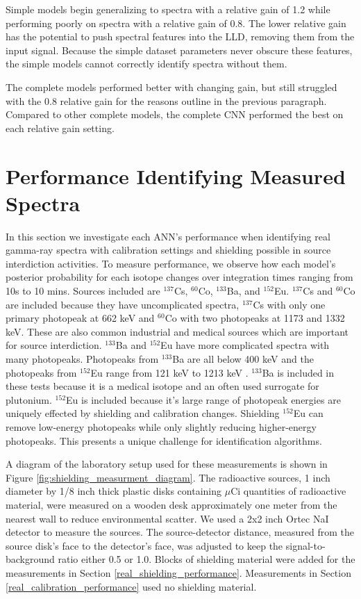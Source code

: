 Simple models begin generalizing to spectra with a relative gain of 1.2 while performing poorly on spectra with a relative gain of 0.8. The lower relative gain has the potential to push spectral features into the LLD, removing them from the input signal. Because the simple dataset parameters never obscure these features, the simple models cannot correctly identify spectra without them.

The complete models performed better with changing gain, but still struggled with the 0.8 relative gain for the reasons outline in the previous paragraph. Compared to other complete models, the complete CNN performed the best on each relative gain setting.

\section{Performance Identifying Measured Spectra} \label{real_spectra_performance}

In this section we investigate each ANN's performance when identifying real gamma-ray spectra with calibration settings and shielding possible in source interdiction activities. To measure performance, we observe how each model's posterior probability for each isotope changes over integration times ranging from 10s to 10 mins. Sources included are $^{137}$Cs, $^{60}$Co, $^{133}$Ba, and $^{152}$Eu. $^{137}$Cs and $^{60}$Co are included because they have uncomplicated spectra, $^{137}$Cs with only one primary photopeak at 662 keV and $^{60}$Co with two photopeaks at 1173 and 1332 keV. These are also common industrial and medical sources which are important for source interdiction. $^{133}$Ba and $^{152}$Eu have more complicated spectra with many photopeaks. Photopeaks from $^{133}$Ba are all below 400 keV and the photopeaks from $^{152}$Eu range from 121 keV to 1213 keV \cite{bigbluebook}. $^{133}$Ba is included in these tests because it is a medical isotope and an often used surrogate for plutonium. $^{152}$Eu is included because it's large range of photopeak energies are uniquely effected by shielding and calibration changes. Shielding $^{152}$Eu can remove low-energy photopeaks while only slightly reducing higher-energy photopeaks. This presents a unique challenge for identification algorithms.

A diagram of the laboratory setup used for these measurements is shown in Figure \ref{fig:shielding_measurment_diagram}. The radioactive sources, 1 inch diameter by 1/8 inch thick plastic disks containing $\mu$Ci quantities of radioactive material, were measured on a wooden desk approximately one meter from the nearest wall to reduce environmental scatter. We used a 2x2 inch Ortec NaI detector to measure the sources. The source-detector distance, measured from the source disk's face to the detector's face, was adjusted to keep the signal-to-background ratio either 0.5 or 1.0. Blocks of shielding material were added for the measurements in Section \ref{real_shielding_performance}. Measurements in Section \ref{real_calibration_performance} used no shielding material. 

